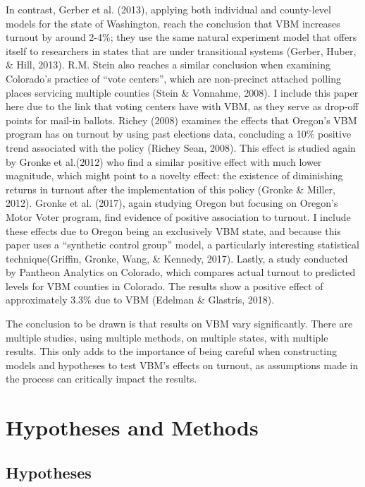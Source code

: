 \documentclass[12pt,twoside]{reedthesis}
\begin{document}
  In contrast, Gerber et al. (2013), applying both individual and
  county-level models for the state of Washington, reach the conclusion
  that VBM increases turnout by around 2-4\%; they use the same natural
  experiment model that offers itself to researchers in states that are
  under transitional systems (Gerber, Huber, \& Hill, 2013). R.M. Stein
  also reaches a similar conclusion when examining Colorado's practice of
  ``vote centers'', which are non-precinct attached polling places
  servicing multiple counties (Stein \& Vonnahme, 2008). I include this
  paper here due to the link that voting centers have with VBM, as they
  serve as drop-off points for mail-in ballots. Richey (2008) examines the
  effects that Oregon's VBM program has on turnout by using past elections
  data, concluding a 10\% positive trend associated with the policy
  (Richey Sean, 2008). This effect is studied again by Gronke et al.(2012)
  who find a similar positive effect with much lower magnitude, which
  might point to a novelty effect: the existence of diminishing returns in
  turnout after the implementation of this policy (Gronke \& Miller,
  2012). Gronke et al. (2017), again studying Oregon but focusing on
  Oregon's Motor Voter program, find evidence of positive association to
  turnout. I include these effects due to Oregon being an exclusively VBM
  state, and because this paper uses a ``synthetic control group'' model,
  a particularly interesting statistical technique(Griffin, Gronke, Wang,
  \& Kennedy, 2017). Lastly, a study conducted by Pantheon Analytics on
  Colorado, which compares actual turnout to predicted levels for VBM
  counties in Colorado. The results show a positive effect of
  approximately 3.3\% due to VBM (Edelman \& Glastris, 2018).
  
  The conclusion to be drawn is that results on VBM vary significantly.
  There are multiple studies, using multiple methods, on multiple states,
  with multiple results. This only adds to the importance of being careful
  when constructing models and hypotheses to test VBM's effects on
  turnout, as assumptions made in the process can critically impact the
  results.
  
  \chapter{Hypotheses and Methods}\label{hypotheses-and-methods}
  
  \section{Hypotheses}\label{hypotheses}
  
\end{document}
